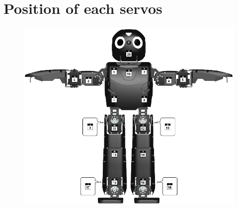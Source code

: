 \documentclass[a4paper, 12pt]{article}  		%
\begin{document}

\section{Position of each servos} \label{sec:servopos}
\vspace{5cm}

\begin{figure}[H]
\begin{center}
\includegraphics[width=16cm]{DARwIn-OP_Actuator.png}
\label{Actuator}
\end{center}
\end{figure}


\end{document}
